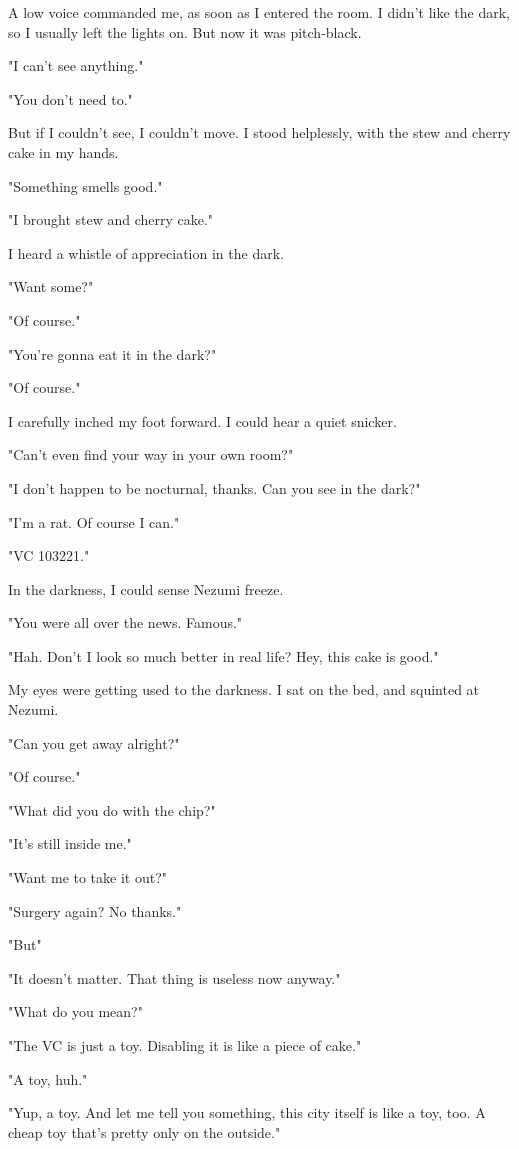 A low voice commanded me, as soon as I entered the room. I didn't like
the dark, so I usually left the lights on. But now it was pitch-black.

"I can't see anything."

"You don't need to."

But if I couldn't see, I couldn't move. I stood helplessly, with the
stew and cherry cake in my hands.

"Something smells good."

"I brought stew and cherry cake."

I heard a whistle of appreciation in the dark.

"Want some?"

"Of course."

"You're gonna eat it in the dark?"

"Of course."

I carefully inched my foot forward. I could hear a quiet snicker.

"Can't even find your way in your own room?"

"I don't happen to be nocturnal, thanks. Can you see in the dark?"

"I'm a rat. Of course I can."

"VC 103221."

In the darkness, I could sense Nezumi freeze.

"You were all over the news. Famous."

"Hah. Don't I look so much better in real life? Hey, this cake is good."

My eyes were getting used to the darkness. I sat on the bed, and
squinted at Nezumi.

"Can you get away alright?"

"Of course."

"What did you do with the chip?"

"It's still inside me."

"Want me to take it out?"

"Surgery again? No thanks."

"But\el "

"It doesn't matter. That thing is useless now anyway."

"What do you mean?"

"The VC is just a toy. Disabling it is like a piece of cake."

"A toy, huh."

"Yup, a toy. And let me tell you something, this city itself is like a
toy, too. A cheap toy that's pretty only on the outside."

